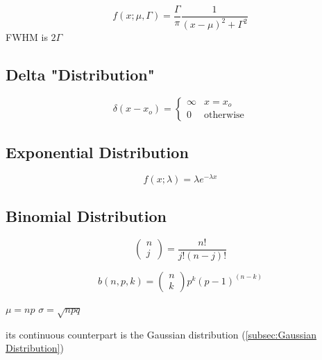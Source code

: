 \documentclass[11pt,a4paper]{book}
\begin{document}
		\begin{equation}
		f(x;\mu, \Gamma)= \dfrac{\Gamma}{\pi} \dfrac{1}{(x-\mu)^2+\Gamma^2}
		\end{equation}
		FWHM is $2\Gamma$
		
	\subsection{Delta "Distribution"}
		\label{subsec:Delta "Distribution"}
		\begin{equation}
		\delta(x-x_o)=
		\begin{cases}{}
		\infty & x=x_o\\
		0 & \text{otherwise}
		\end{cases}
		\end{equation}
	\subsection{Exponential Distribution}
	\label{subsec:Exponential Distribution}
	\begin{equation}
	f(x;\lambda)= \lambda e^{-\lambda x}
	\end{equation}
	\subsection{Binomial Distribution}
	\label{subsec:Binomial Distribution}
	\begin{equation}
	\begin{pmatrix}
	n \\
	j
	\end{pmatrix}
	=
	\dfrac{n!}{j!(n-j)!}
	\end{equation}
	
	\begin{equation}
	b(n,p,k) =
	\begin{pmatrix}
	n \\
	k
	\end{pmatrix}
	p^k(p-1)^{(n-k)}
	\end{equation}
	
	$\mu = np$ $\sigma =\sqrt{npq}$
	
	its continuous counterpart is the Gaussian distribution (\autoref{subsec:Gaussian Distribution})
\end{document}
